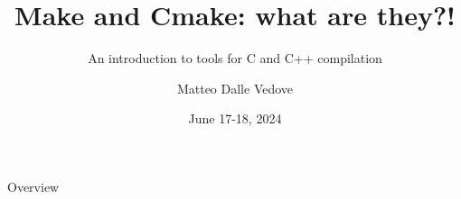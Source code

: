 \documentclass[12pt,aspectratio=169]{beamer}
\title{Make and Cmake: what are they?!}
\subtitle{An introduction to tools for C and C++ compilation}
\author{Matteo Dalle Vedove}
\institute{Dept. of Industrial Engineering, University of Trento}
\date{June 17-18, 2024}
\begin{document}
    \maketitle

    \begin{frame}{Overview}
        \tableofcontents
    \end{frame}

    
    
    
    
    
    
\end{document}
